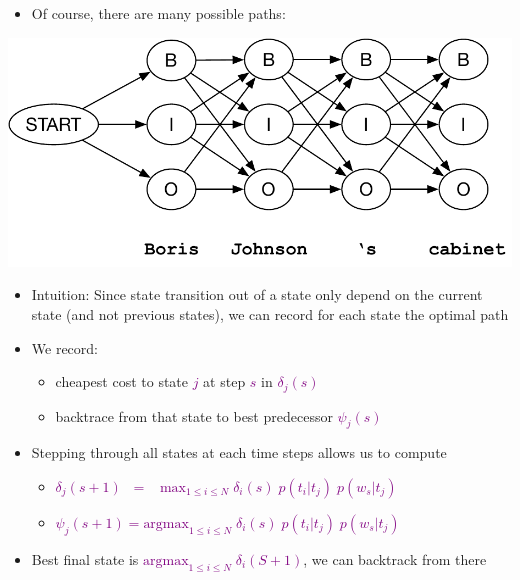\documentclass[landscape]{jhuslides3C}
\newcommand{\maths}[1]{\textcolor{purple}{#1}}
\begin{document}
\vfill
\begin{itemize}
\item Of course, there are many possible paths:
\end{itemize}
\vfill
\begin{center}
\includegraphics[scale=1.2]{hmm-search-ne3.pdf}
\end{center}
\vfill


\vfill
\begin{itemize}
\item Intuition: Since state transition out of a state only depend on the current state (and not previous states), we can record for each state the optimal path\pause
\item We record:
\begin{itemize}
\item cheapest cost to state \maths{$j$} at step \maths{$s$} in \maths{$\delta_j(s)$}
\item backtrace from that state to best predecessor \maths{$\psi_j(s)$}\pause
\end{itemize}
\item Stepping through all states at each time steps allows us to compute
\begin{itemize}
\item \maths{$\delta_j(s+1) \; \; = \; \; \; \mbox{max}_{1 \le i \le N} \; \delta_i(s) \; p(t_i|t_j)\; p(w_s|t_j)$}
\item \maths{$\psi_j(s+1) = \mbox{argmax}_{1 \le i \le N} \; \delta_i(s) \; p(t_i|t_j)\; p(w_s|t_j)$}\pause
\end{itemize}
\item Best final state is \maths{$\mbox{argmax}_{1 \le i \le N} \; \delta_i(S+1)$}, we can backtrack from there
\end{itemize}
\vfill
\end{document}

